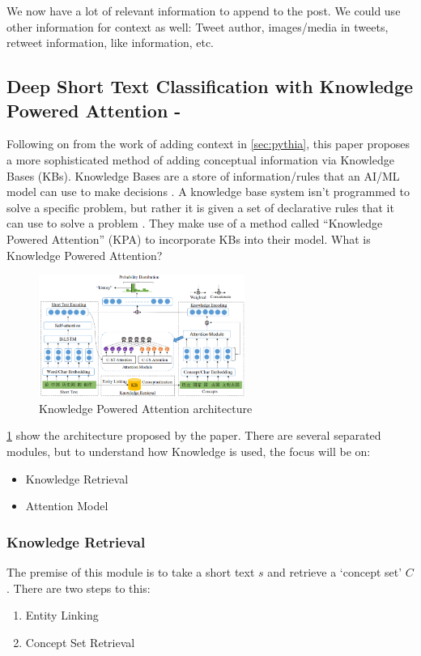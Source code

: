 We now have a lot of relevant information to append to the post. We could use other information for context as well: Tweet author,
images/media in tweets, retweet information, like information, etc.

\subsection{Deep Short Text Classification with Knowledge Powered Attention - \cite{DeepShortText}}
Following on from the work of adding context in \cref{sec:pythia}, this paper proposes a more sophisticated method of adding
conceptual information via Knowledge Bases (KBs). Knowledge Bases are a store of information/rules that an AI/ML model can use
to make decisions \cite{kb}. A knowledge base system isn't programmed to solve a specific problem, but rather it is given a
set of declarative rules that it can use to solve a problem \cite{kb}. They make use of a method called ``Knowledge Powered Attention'' (KPA) to
incorporate KBs into their model. What is Knowledge Powered Attention?\\
\begin{figure}[hbtp]
    \centering
    \includegraphics[width=0.6\textwidth]{../images/kpa.png}
    \caption{Knowledge Powered Attention architecture}
    \label{fig:kpa}
\end{figure}

\cref{fig:kpa} show the architecture proposed by the paper. There are several separated modules, but to understand how Knowledge
is used, the focus will be on:
\begin{itemize}
    \item Knowledge Retrieval
    \item Attention Model
\end{itemize}

\subsubsection{Knowledge Retrieval}
The premise of this module is to take a short text $s$ and retrieve a `concept set' $C$. There are two steps to this:
\begin{enumerate}
    \item Entity Linking
    \item Concept Set Retrieval
\end{enumerate}

